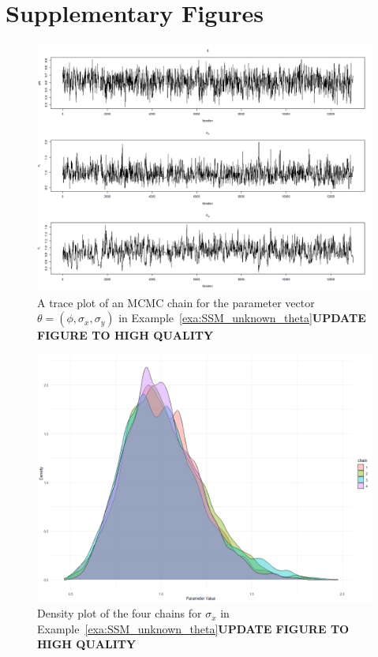 \chapter{Supplementary Figures}
\begin{figure}
	\centering
	\includegraphics[width=1\textwidth]{chain_plot.png}
	\caption{A trace plot of an MCMC chain for the parameter vector $\theta=(\phi, \sigma_x, \sigma_y)$ in Example~\ref{exa:SSM_unknown_theta}\textbf{UPDATE FIGURE TO HIGH QUALITY}}
	\label{fig:chain}
\end{figure} 

\label{chap:supplementary_figures}
\begin{figure}
	\centering
	\includegraphics[width=\textwidth]{sigma_x_density_plot.png}
	\caption{Density plot of the four chains for $\sigma_x$ in Example~\ref{exa:SSM_unknown_theta}\textbf{UPDATE FIGURE TO HIGH QUALITY}}
	\label{fig:sigma_x_dens}
\end{figure}

